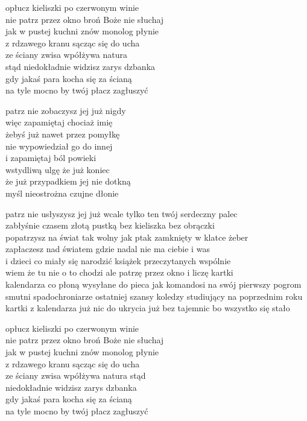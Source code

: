\begin{text}
    opłucz kieliszki po czerwonym winie\\
    nie patrz przez okno broń Boże nie słuchaj\\
    jak w pustej kuchni znów monolog płynie\\
    z rdzawego kranu sącząc się do ucha\\
    ze ściany zwisa wpółżywa natura\\
    stąd niedokładnie widzisz zarys dzbanka\\
    gdy jakaś para kocha się za ścianą\\
    na tyle mocno by twój płacz zagłuszyć

    patrz nie zobaczysz jej już nigdy\\
    więc zapamiętaj chociaż imię\\
    żebyś już nawet przez pomyłkę\\
    nie wypowiedział go do innej\\
    i zapamiętaj ból powieki\\
    wstydliwą ulgę że już koniec\\
    że już przypadkiem jej nie dotkną\\
    myśl nieostrożna czujne dłonie

    patrz nie usłyszysz jej już wcale tylko ten twój serdeczny palec\\
    zabłyśnie czasem złotą pustką bez kieliszka bez obrączki\\
    popatrzysz na świat tak wolny jak ptak zamknięty w klatce żeber\\
    zapłaczesz nad światem gdzie nadal nie ma ciebie i was\\
    i dzieci co miały się narodzić książek przeczytanych wspólnie\\
    wiem że tu nie o to chodzi ale patrzę przez okno i liczę kartki\\
    kalendarza co płoną wysyłane do pieca jak komandosi na swój pierwszy pogrom\\
    smutni spadochroniarze ostatniej szansy koledzy studiujący na poprzednim roku\\
    kartki z kalendarza już nic do ukrycia już bez tajemnic bo wszystko się stało

    opłucz kieliszki po czerwonym winie\\
    nie patrz przez okno broń Boże nie słuchaj\\
    jak w pustej kuchni znów monolog płynie\\
    z rdzawego kranu sącząc się do ucha\\
    ze ściany zwisa wpółżywa natura stąd\\
    niedokładnie widzisz zarys dzbanka\\
    gdy jakaś para kocha się za ścianą\\
    na tyle mocno by twój płacz zagłuszyć
\end{text}
\begin{chord}

\end{chord}